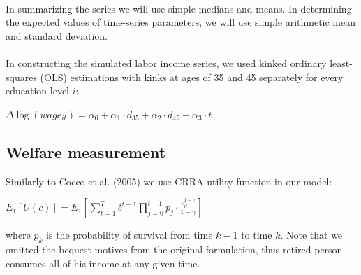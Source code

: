 \documentclass[]{article}
\begin{document}
\paragraph{}
In summarizing the series we will use simple medians and means. In determining the expected values of time-series parameters, we will use simple arithmetic mean and standard deviation.

\paragraph{}
In constructing the simulated labor income series, we used kinked ordinary least-squares (OLS) estimations with kinks at ages of 35 and 45 separately for every education level $i$:

\begin{center}
	$\Delta\log (wage_{it}) = \alpha_0 + \alpha_1 \cdot d_{35} + \alpha_2 \cdot d_{45} + \alpha_3 \cdot t$
\end{center}




\subsection{Welfare measurement}
Similarly to Cocco et al. (2005) we use CRRA utility function in our model:

\begin{center}
	$E_1[U(c)] = E_1 \left[\displaystyle\sum^T_{t=1} \delta^{t-1} \displaystyle\prod^{t-1}_{j=0} p_j \cdot \frac{c^{1-\gamma}_{it}}{1-\gamma}\right]$
\end{center}

where $p_k$ is the probability of survival from time $k-1$ to time $k$. Note that we omitted the bequest motives from the original formulation, thus retired person consumes all of his income at any given time.


\end{document}
